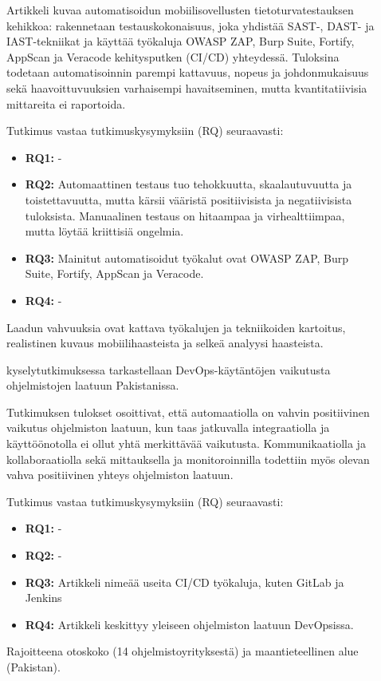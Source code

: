 \documentclass[bscthesis,finnish,oneside,biblatex]{uefcsthesis}
\begin{document}
\begin{description}
    \item[\cite{nutalapati2023_tools_techniques}] Artikkeli kuvaa automatisoidun mobiilisovellusten tietoturvatestauksen kehikkoa: rakennetaan testauskokonaisuus, joka yhdistää SAST-, DAST- ja IAST-tekniikat ja käyttää työkaluja OWASP ZAP, Burp Suite, Fortify, AppScan ja Veracode kehitysputken (CI/CD) yhteydessä. Tuloksina todetaan automatisoinnin parempi kattavuus, nopeus ja johdonmukaisuus sekä haavoittuvuuksien varhaisempi havaitseminen, mutta kvantitatiivisia mittareita ei raportoida.

    Tutkimus vastaa tutkimuskysymyksiin (RQ) seuraavasti:
    \begin{itemize}
        \item \textbf{RQ1:} -
        \item \textbf{RQ2:} Automaattinen testaus tuo tehokkuutta, skaalautuvuutta ja toistettavuutta, mutta kärsii vääristä positiivisista ja negatiivisista tuloksista. Manuaalinen testaus on hitaampaa ja virhealttiimpaa, mutta löytää kriittisiä ongelmia.
        \item \textbf{RQ3:} Mainitut automatisoidut työkalut ovat OWASP ZAP, Burp Suite, Fortify, AppScan ja Veracode.
        \item \textbf{RQ4:} -
    \end{itemize}

    Laadun vahvuuksia ovat kattava työkalujen ja tekniikoiden kartoitus, realistinen kuvaus mobiilihaasteista ja selkeä analyysi haasteista.
\end{description}

\begin{description}
    \item[\cite{saleem2023_survey}] kyselytutkimuksessa tarkastellaan DevOps-käytäntöjen vaikutusta ohjelmistojen laatuun Pakistanissa.

    Tutkimuksen tulokset osoittivat, että automaatiolla on vahvin positiivinen vaikutus ohjelmiston laatuun, kun taas jatkuvalla integraatiolla ja käyttöönotolla ei ollut yhtä merkittävää vaikutusta. Kommunikaatiolla ja kollaboraatiolla sekä mittauksella ja monitoroinnilla todettiin myös olevan vahva positiivinen yhteys ohjelmiston laatuun.

    Tutkimus vastaa tutkimuskysymyksiin (RQ) seuraavasti:
    \begin{itemize}
        \item \textbf{RQ1:} -
        \item \textbf{RQ2:} -
        \item \textbf{RQ3:} Artikkeli nimeää useita CI/CD työkaluja, kuten GitLab ja Jenkins
        \item \textbf{RQ4:} Artikkeli keskittyy yleiseen ohjelmiston laatuun DevOpsissa.
    \end{itemize}

    Rajoitteena otoskoko (14 ohjelmistoyrityksestä) ja maantieteellinen alue (Pakistan).
\end{description}
\end{document}

